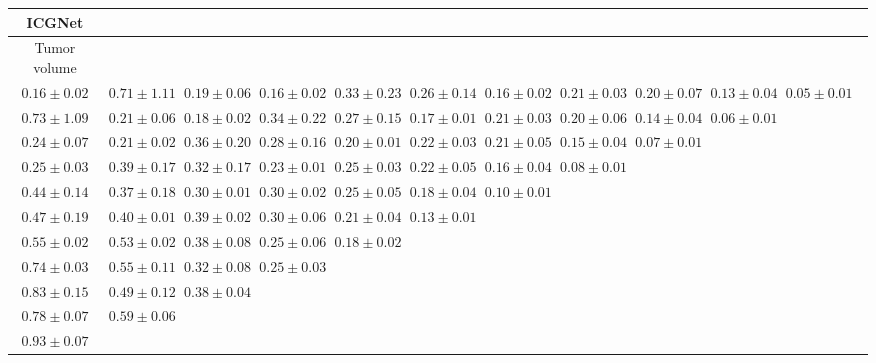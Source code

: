 \begin{table}[ht]
{{\begin{adjustbox}{width=\textwidth}
\begin{tabular}{cccccccccccc}
\hline
ICGNet &  &  &  &  &  &  &  &  &  & \\
\hline
Tumor volume &  &  &  &  &  &  &  &  &  & \\
\hline
$0.16 \pm 0.02$ & $0.71 \pm 1.11$ & $0.19 \pm 0.06$ & $0.16 \pm 0.02$ & $0.33 \pm 0.23$ & $0.26 \pm 0.14$ & $0.16 \pm 0.02$ & $0.21 \pm 0.03$ & $0.20 \pm 0.07$ & $0.13 \pm 0.04$ & $0.05 \pm 0.01$ &  \\
$0.73 \pm 1.09$ & $0.21 \pm 0.06$ & $0.18 \pm 0.02$ & $0.34 \pm 0.22$ & $0.27 \pm 0.15$ & $0.17 \pm 0.01$ & $0.21 \pm 0.03$ & $0.20 \pm 0.06$ & $0.14 \pm 0.04$ & $0.06 \pm 0.01$ &  &  \\
$0.24 \pm 0.07$ & $0.21 \pm 0.02$ & $0.36 \pm 0.20$ & $0.28 \pm 0.16$ & $0.20 \pm 0.01$ & $0.22 \pm 0.03$ & $0.21 \pm 0.05$ & $0.15 \pm 0.04$ & $0.07 \pm 0.01$ &  &  &  \\
$0.25 \pm 0.03$ & $0.39 \pm 0.17$ & $0.32 \pm 0.17$ & $0.23 \pm 0.01$ & $0.25 \pm 0.03$ & $0.22 \pm 0.05$ & $0.16 \pm 0.04$ & $0.08 \pm 0.01$ &  &  &  &  \\
$0.44 \pm 0.14$ & $0.37 \pm 0.18$ & $0.30 \pm 0.01$ & $0.30 \pm 0.02$ & $0.25 \pm 0.05$ & $0.18 \pm 0.04$ & $0.10 \pm 0.01$ &  &  &  &  &  \\
$0.47 \pm 0.19$ & $0.40 \pm 0.01$ & $0.39 \pm 0.02$ & $0.30 \pm 0.06$ & $0.21 \pm 0.04$ & $0.13 \pm 0.01$ &  &  &  &  &  &  \\
$0.55 \pm 0.02$ & $0.53 \pm 0.02$ & $0.38 \pm 0.08$ & $0.25 \pm 0.06$ & $0.18 \pm 0.02$ &  &  &  &  &  &  &  \\
$0.74 \pm 0.03$ & $0.55 \pm 0.11$ & $0.32 \pm 0.08$ & $0.25 \pm 0.03$ &  &  &  &  &  &  &  &  \\
$0.83 \pm 0.15$ & $0.49 \pm 0.12$ & $0.38 \pm 0.04$ &  &  &  &  &  &  &  &  &  \\
$0.78 \pm 0.07$ & $0.59 \pm 0.06$ &  &  &  &  &  &  &  &  &  &  \\
$0.93 \pm 0.07$ &  &  &  &  &  &  &  &  &  &  &  \\



\end{tabular}
\end{adjustbox}}}
\end{table}

